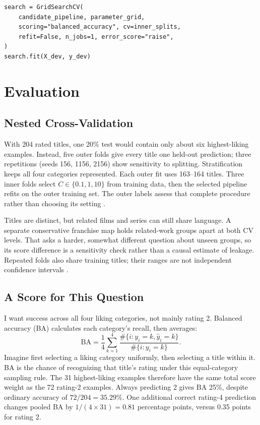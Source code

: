 \documentclass[11pt,letterpaper]{article}
\begin{document}
\begin{lstlisting}[caption={Five-fold development selection fits the complete feature-and-classifier pipeline. Family finalists are explicitly refitted afterward; the test set does not select them.}]
search = GridSearchCV(
    candidate_pipeline, parameter_grid,
    scoring="balanced_accuracy", cv=inner_splits,
    refit=False, n_jobs=1, error_score="raise",
)
search.fit(X_dev, y_dev)
\end{lstlisting}


\FloatBarrier
\section{Evaluation}
\subsection{Nested Cross-Validation}
With 204 rated titles, one 20\% test would contain only about six highest-liking examples. Instead, five outer folds give every title one held-out prediction; three repetitions (seeds 156, 1156, 2156) show sensitivity to splitting. Stratification keeps all four categories represented. Each outer fit uses 163--164 titles. Three inner folds select $C\in\{0.1,1,10\}$ from training data, then the selected pipeline refits on the outer training set. The outer labels assess that complete procedure rather than choosing its setting \cite{nested}.

Titles are distinct, but related films and series can still share language. A separate conservative franchise map holds related-work groups apart at both CV levels. That asks a harder, somewhat different question about unseen groups, so its score difference is a sensitivity check rather than a causal estimate of leakage. Repeated folds also share training titles; their ranges are not independent confidence intervals \cite{bates}.

\subsection{A Score for This Question}
I want success across all four liking categories, not mainly rating 2. Balanced accuracy (BA) calculates each category's recall, then averages:
\[
\mathrm{BA}=\frac14\sum_{k=1}^4
\frac{\#\{i:y_i=k,\hat y_i=k\}}{\#\{i:y_i=k\}}.
\]
Imagine first selecting a liking category uniformly, then selecting a title within it. BA is the chance of recognizing that title's rating under this equal-category sampling rule. The 31 highest-liking examples therefore have the same total score weight as the 72 rating-2 examples. Always predicting 2 gives BA 25\%, despite ordinary accuracy of $72/204=35.29\%$. One additional correct rating-4 prediction changes pooled BA by $1/(4\times31)=0.81$ percentage points, versus 0.35 points for rating 2.
\end{document}

